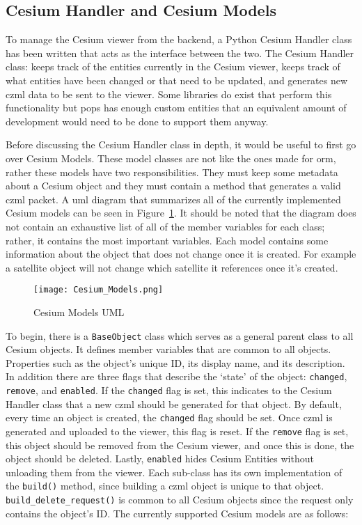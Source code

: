 \subsection{Cesium Handler and Cesium Models}

To manage the Cesium viewer from the backend, a Python Cesium Handler class has
been written that acts as the interface between the two. The Cesium Handler
class: keeps track of the entities currently in the Cesium viewer, keeps track
of what entities have been changed or that need to be updated, and generates
new \gls{czml} data to be sent to the viewer. Some libraries do exist that
perform this functionality but \gls{pops} has enough custom entities that an
equivalent amount of development would need to be done to support them anyway.

Before discussing the Cesium Handler class in depth, it would be useful to
first go over Cesium Models. These model classes are not like the ones made for
\gls{orm}, rather these models have two responsibilities. They must keep some
metadata about a Cesium object and they must contain a method that generates a
valid \gls{czml} packet. A \gls{uml} diagram that summarizes all of the
currently implemented Cesium models can be seen in
Figure~\ref{fig:cesium_models}. It should be noted that the diagram does not
contain an exhaustive list of all of the member variables for each class;
rather, it contains the most important variables. Each model contains some
information about the object that does not change once it is created. For
example a satellite object will not change which satellite it references once
it's created. 

\begin{figure}
    \centering
    \texttt{[image: Cesium\_Models.png]} 
    \caption{Cesium Models UML}
\label{fig:cesium_models}
\end{figure}

To begin, there is a \texttt{BaseObject} class which serves as a general parent
class to all Cesium objects. It defines member variables that are common to all
objects. Properties such as the object's unique ID, its display name, and its
description. In addition there are three flags that describe the `state' of the
object: \texttt{changed}, \texttt{remove}, and \texttt{enabled}. If the
\texttt{changed} flag is set, this indicates to the Cesium Handler class that a
new \gls{czml} should be generated for that object. By default, every time an
object is created, the \texttt{changed} flag should be set. Once \gls{czml} is
generated and uploaded to the viewer, this flag is reset. If the
\texttt{remove} flag is set, this object should be removed from the Cesium
viewer, and once this is done, the object should be deleted. Lastly,
\texttt{enabled} hides Cesium Entities without unloading them from the viewer.
Each sub-class has its own implementation of the \texttt{build()} method, since
building a \gls{czml} object is unique to that object.
\texttt{build\_delete\_request()} is common to all Cesium objects since the
request only contains the object's ID. The currently supported Cesium models
are as follows:

